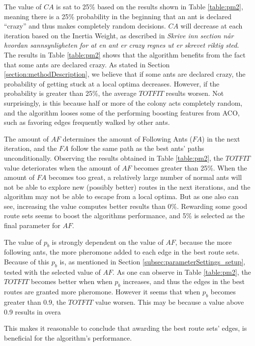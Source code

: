 The value of $CA$ is sat to 25\% based on the results shown in Table \ref{table:pm2}, meaning there is a 25\% probability in the beginning that an ant is declared ``crazy'' and thus makes completely random decisions. $CA$ will decrease at each iteration based on the Inertia Weight, as described in \emph{\color{blue} Skrive inn section når hvordan sannsynligheten for at en ant er crazy regnes ut er skrevet riktig sted}. The results in Table \vref{table:pm2} shows that the algorithm benefits from the fact that some ants are declared crazy. As stated in Section \vref{section:methodDescription}, we believe that if some ants are declared crazy, the probability of getting stuck at a local optima decreases. However, if the probability is greater than 25\%, the average $TOTFIT$ results worsen. Not surprisingly, is this because half or more of the colony acts completely random, and the algorithm looses some of the performing boosting features from ACO, such as favoring edges frequently walked by other ants. 
\newline

The amount of $AF$ determines the amount of Following Ants ($FA$) in the next iteration, and the $FA$ follow the same path as the best ants' paths unconditionally. Observing the results obtained in Table \vref{table:pm2}, the $TOTFIT$ value deteriorates when the amount of $AF$ becomes greater than 25\%. When the amount of $FA$ becomes too great, a relatively large number of normal ants will not be able to explore new (possibly better) routes in the next iterations, and the algorithm may not be able to escape from a local optima. But as one also can see,  increasing the value computes better results than 0\%. Rewarding some good route sets seems to boost the algorithms performance, and 5\% is selected as the final parameter for $AF$. 

The value of $p_b$ is strongly dependent on the value of $AF$, because the more following ants, the more pheromone added to each edge in the best route sets. Because of this $p_b$ is, as mentioned in Section \vref{subsec:parameterSettings_setup}, tested with the selected value of $AF$. As one can observe in Table \vref{table:pm2}, the $TOTFIT$ becomes better when when $p_b$ increases, and thus the edges in the best routes are granted more pheromone. However it seems that when $p_b$ becomes greater than 0.9, the $TOTFIT$ value worsen. This may be because a value above 0.9 results in overa

This makes it reasonable to conclude that awarding the best route sets' edges, is beneficial for the algorithm's performance.


